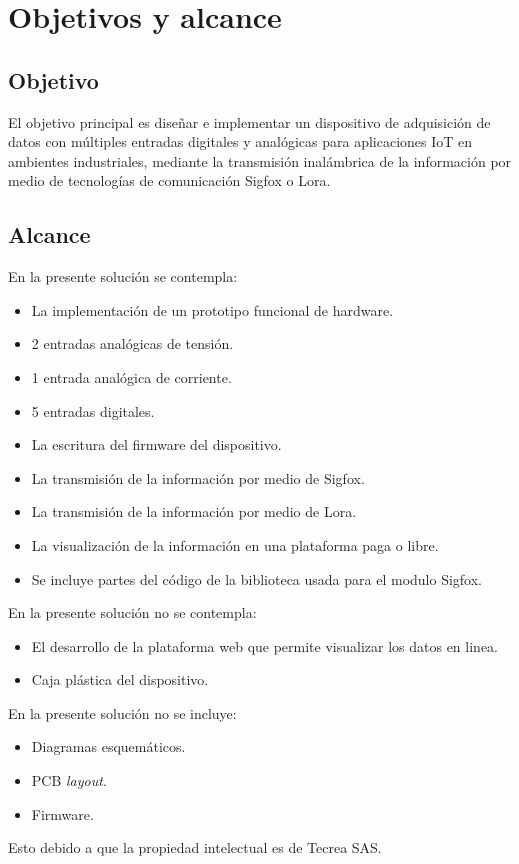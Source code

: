 \section{Objetivos y alcance}

\subsection{Objetivo}
El objetivo principal es diseñar e implementar un dispositivo de adquisición de datos con múltiples entradas digitales y analógicas para aplicaciones IoT en ambientes industriales, mediante la transmisión inalámbrica de la información por medio de tecnologías de comunicación Sigfox o Lora. 

\subsection{Alcance}

En la presente solución se contempla:


\begin{itemize}
	\item La implementación de un prototipo funcional de hardware.
	\item 2 entradas analógicas de tensión.
	\item 1 entrada analógica de corriente.
	\item 5 entradas digitales.
	\item La escritura del firmware del dispositivo.
	\item La transmisión de la información por medio de Sigfox.
	\item La transmisión de la información por medio de Lora.
	\item La visualización de la información en una plataforma paga o libre.
	\item Se incluye partes del código de la biblioteca usada para el modulo Sigfox.
\end{itemize}
En la presente solución no se contempla:
\begin{itemize}
	\item El desarrollo de la plataforma web que permite visualizar los datos en linea.
	\item Caja plástica del dispositivo.
\end{itemize}
En la presente solución no se incluye:
\begin{itemize}
	\item Diagramas esquemáticos.
	\item PCB \textit{layout}.
	\item Firmware.
\end{itemize}

Esto debido a que la propiedad intelectual es de Tecrea SAS.



